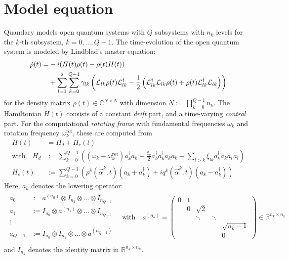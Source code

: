 \documentclass[letterpaper]{article}
\newcommand{\Ell}{\mathcal{L}}
\newcommand{\R}{\mathds{R}}
\newcommand{\C}{\mathds{C}}
\begin{document}
\section{Model equation}
Quandary models open quantum systems with $Q$ subsystems with $n_k$ levels for the
$k$-th subsystem, $k=0,\dots,Q-1$. The time-evolution of the open quantum system is modeled by Lindblad's master equation:
\begin{align}\label{mastereq}
  \dot \rho(t) = &-i(H(t)\rho(t) - \rho(t)H(t)) \notag \\
  &+ \sum_{l=1}^2 \sum_{k=0}^{Q-1} \gamma_{lk} \left( \Ell_{lk} \rho(t)
  \Ell_{lk}^{\dagger} - \frac 1 2 \left( \Ell_{lk}^{\dagger}\Ell_{lk}
  \rho(t) + \rho(t)\Ell_{lk}^{\dagger} \Ell_{lk}\right) \right)
\end{align}
for the density matrix $\rho(t)\in \C^{N\times N}$ with dimension $N :=
\prod_{k=0}^{Q-1} n_k$. The Hamiltonian $H(t)$ consists of a constant \textit{drift}
part, and a time-varying \textit{control} part. For the computational
\textit{rotating frame} with fundamental frequencies $\omega_k$ and rotation
frequency $\omega_k^{\text{rot}}$, these are computed from
\begin{align}
  H(t) &= H_d + H_c(t) \\
  \text{with} \quad H_d &:= \sum_{k=0}^{Q-1} \left(\left(\omega_k -                                 
  \omega_k^{\text{rot}}\right)a_k^{\dagger}a_k- \frac{\xi_k}{2}
  a_k^{\dagger}a_k^{\dagger}a_k a_k - \sum_{l> k} \xi_{lk}
  a_{k}^{\dagger}a_{k}
  a_{l}^{\dagger} a_{l} \right) \\
   H_c(t) &:= \sum_{k=0}^{Q-1} \left( p^k(\vec{\alpha}^k,t) (a_k +
   a_k^{\dagger}) + i q^k(\vec{\alpha}^k,t)(a_k - a_k^{\dagger})
   \right)
\end{align}
Here, $a_k$ denotes the lowering operator:
\begin{align}
  \begin{array}{rl}
  a_0 &:= a^{(n_0)} \otimes I_{n_1} \otimes \dots \otimes
  I_{n_{Q-1}}\\
  a_1 &:= I_{n_0} \otimes a^{(n_1)} \otimes \dots \otimes
  I_{n_{Q-1}}\\
  \vdots \, & \\
  a_{Q-1} &:= I_{n_0} \otimes I_{n_1} \otimes \dots \otimes
  a^{(n_{Q-1})}\\
  \end{array}
  \quad \text{with}\quad
 a^{(n_k)} = \begin{pmatrix}
   0 & 1 &          &         &    \\
     & 0 & \sqrt{2} &         &     \\
     &   & \ddots   & \ddots  &    \\
     &   &          &         & \sqrt{n_k-1}  \\
     &   &          &         & 0   
 \end{pmatrix} \in \R^{n_k \times n_k}
\end{align}
and $I_{n_k}$ denotes the identity matrix in $\R^{n_k \times n_k}$.
\end{document}
